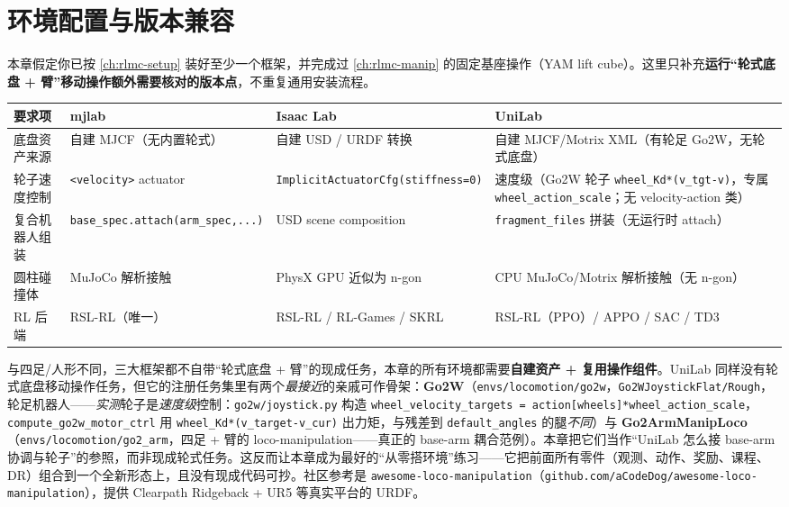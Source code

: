 \section{环境配置与版本兼容}
\label{sec:rlmc-wh-setup}

本章假定你已按 \cref{ch:rlmc-setup} 装好至少一个框架，并完成过 \cref{ch:rlmc-manip} 的固定基座操作（YAM lift cube）。这里只补充\textbf{运行“轮式底盘 + 臂”移动操作额外需要核对的版本点}，不重复通用安装流程。

\begin{center}
\small
\begin{tabular}{@{}llll@{}}
\toprule
要求项 & mjlab & Isaac Lab & UniLab \\
\midrule
底盘资产来源 & 自建 MJCF（无内置轮式） & 自建 USD / URDF 转换 & 自建 MJCF/Motrix XML（有轮足 Go2W，无轮式底盘） \\
轮子速度控制 & \verb|<velocity>| actuator & \verb|ImplicitActuatorCfg(stiffness=0)| & 速度级（Go2W 轮子 \verb|wheel_Kd*(v_tgt-v)|，专属 \verb|wheel_action_scale|；无 velocity-action 类） \\
复合机器人组装 & \verb|base_spec.attach(arm_spec,...)| & USD scene composition & \verb|fragment_files| 拼装（无运行时 attach） \\
圆柱碰撞体 & MuJoCo 解析接触 & PhysX GPU 近似为 n-gon & CPU MuJoCo/Motrix 解析接触（无 n-gon） \\
RL 后端 & RSL-RL（唯一） & RSL-RL / RL-Games / SKRL & RSL-RL（PPO）/ APPO / SAC / TD3 \\
\bottomrule
\end{tabular}
\end{center}

\begin{note}
与四足/人形不同，三大框架都不自带“轮式底盘 + 臂”的现成任务，本章的所有环境都需要\textbf{自建资产 + 复用操作组件}。UniLab 同样没有轮式底盘移动操作任务，但它的注册任务集里有两个\emph{最接近}的亲戚可作骨架：\textbf{Go2W}（\verb|envs/locomotion/go2w|，\verb|Go2WJoystickFlat/Rough|，轮足机器人——\emph{实测}轮子是\emph{速度级}控制：\verb|go2w/joystick.py| 构造 \verb|wheel_velocity_targets = action[wheels]*wheel_action_scale|，\verb|compute_go2w_motor_ctrl| 用 \verb|wheel_Kd*(v_target-v_cur)| 出力矩，与残差到 \verb|default_angles| 的腿\emph{不同}）与 \textbf{Go2ArmManipLoco}（\verb|envs/locomotion/go2_arm|，四足 + 臂的 loco-manipulation——真正的 base-arm 耦合范例）。本章把它们当作“UniLab 怎么接 base-arm 协调与轮子”的参照，而非现成轮式任务。这反而让本章成为最好的“从零搭环境”练习——它把前面所有零件（观测、动作、奖励、课程、DR）组合到一个全新形态上，且没有现成代码可抄。社区参考是 \verb|awesome-loco-manipulation|（\verb|github.com/aCodeDog/awesome-loco-manipulation|），提供 Clearpath Ridgeback + UR5 等真实平台的 URDF。
\end{note}

